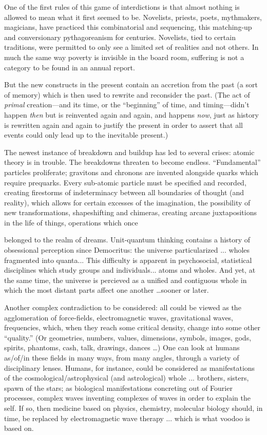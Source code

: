\documentclass[11pt,twoside,draft]{memoir}
\begin{document}
One of the first rules of this game of
interdictions is that almost nothing is allowed to mean what it first seemed to be.
Novelists, priests, poets, mythmakers, magicians, have practiced this combinatorial and
sequencing, this matching-up and conversionary pythagoreanism for centuries. Novelists, tied to certain traditions, were permitted
to only see a limited set of realities and not
others. In much the same way poverty is
invisible in the board room, suffering is not a
category to be found in an annual report.

But the new constructs in the present
contain an accretion from the past (a sort of
memory) which is then used to rewrite and
reconsider the past. (The act of \emph{primal} creation---and its time, or the \enquote{beginning} of
time, and timing---didn't happen \emph{then} but is
reinvented again and again, and happens \emph{now}, just as history is rewritten again and
again to justify the present in order to assert that all events could only lead up to the
inevitable present.)

The newest instance of breakdown and
buildup has led to several crises: atomic
theory is in trouble. The breakdowns threaten
to become endless. \enquote{Fundamental} particles
proliferate; gravitons and chronons are invented 
alongside quarks which require prequarks. Every sub-atomic particle must be
specified and recorded, creating firestorms of indeterminacy between all boundaries of
thought (and reality), which allows for certain 
excesses of the imagination, the possibility of new transformations, shapeshifting
and chimeras, creating arcane juxtapositions
in the life of things, operations which once

belonged to the realm of dreams. Unit-quantum thinking contains a history of obsessional perception since Democritus: the universe particularized ... wholes fragmented
into quanta... This difficulty is apparent in psychosocial, statistical disciplines which
study groups and individuals... atoms and wholes. And yet, at the same time, the 
universe is percieved as a unified and contiguous whole in which the most distant parts
affect one another \ldots sooner or later.

Another complex contradiction to be considered: all could be viewed as the agglomeration of force-fields, electromagnetic waves, gravitational waves, frequencies, which,
when they reach some critical density, change into some other \enquote{quality.} (Or geometries,
numbers, values, dimensions, symbols, images, gods, spirits, phantoms, cash, talk,
drawings, dances \ldots ) One can look at humans as\slash of\slash in these fields in many ways,
from many angles, through a variety of disciplinary lenses. Humans, for instance, could
be considered as manifestations of the cosmological/astrophysical (and astrological)
whole ... brothers, sisters, spawn of the stars;
as biological manifestations concreting out of Fourier processes, complex waves
inventing complexes of waves in order to explain the self. If so, then medicine based
on physics, chemistry, molecular biology
should, in time, be replaced by electromagnetic wave therapy ... which is what voodoo is based on.
\end{document}
